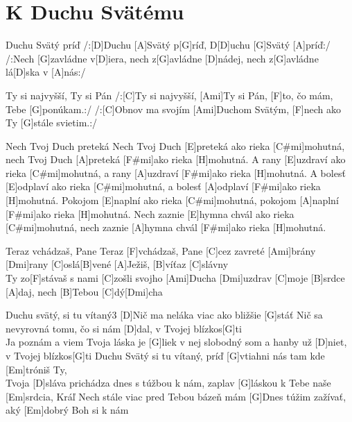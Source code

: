 \documentclass[12pt]{article}
\begin{document}
\newpage
\section{K Duchu Svätému}

\begin{songgroup}{2}
	\begin{groupitem}{Duchu Svätý príď}
		/:[D]Duchu [A]Svätý p[G]ríď,
		D[D]uchu [G]Svätý [A]príď:/
		\\
		/:Nech [G]zavládne v[D]iera,
		nech z[G]avládne [D]nádej,
		nech z[G]avládne lá[D]ska v [A]nás:/
	\end{groupitem}
	\columnbreak
	\begin{groupitem}{Ty si najvyšší, Ty si Pán}
		/:[C]Ty si najvyšší, [Ami]Ty si Pán,
		[F]to, čo mám, Tebe [G]ponúkam.:/
		/:[C]Obnov ma svojím [Ami]Duchom Svätým,
		[F]nech ako Ty [G]stále svietim.:/
	\end{groupitem}
\end{songgroup}

\begin{songgroup}{2}
	\begin{groupitem}{Nech Tvoj Duch preteká}
		Nech Tvoj Duch [E]preteká ako rieka [C#mi]mohutná,
		nech Tvoj Duch [A]preteká [F#mi]ako rieka [H]mohutná.
		A rany [E]uzdraví ako rieka [C#mi]mohutná,
		a rany [A]uzdraví [F#mi]ako rieka [H]mohutná.
		A bolesť [E]odplaví ako rieka [C#mi]mohutná,
		a bolesť [A]odplaví [F#mi]ako rieka [H]mohutná.
		Pokojom [E]naplní ako rieka [C#mi]mohutná,
		pokojom [A]naplní [F#mi]ako rieka [H]mohutná.
		Nech zaznie [E]hymna chvál ako rieka 
		[C#mi]mohutná,
		nech zaznie [A]hymna chvál [F#mi]ako rieka 
		[H]mohutná.
	\end{groupitem}
	\columnbreak
	\begin{groupitem}{Teraz vchádzaš, Pane}
		Teraz [F]vchádzaš, Pane
		[C]cez zavreté [Ami]brány
		[Dmi]rany [C]oslá[B]vené
		[A]Ježiš, [B]víťaz [C]slávny
		\\
		Ty zo[F]stávaš s nami
		[C]zošli svojho [Ami]Ducha
		[Dmi]uzdrav [C]moje [B]srdce
		[A]daj, nech [B]Tebou [C]dý[Dmi]cha
	\end{groupitem}
\end{songgroup}

\begin{song}{Duchu svätý, si tu vítaný}{3}
	[D]Nič ma neláka viac
	ako bližšie [G]stáť
	Nič sa nevyrovná
	tomu, čo si nám [D]dal,
	v Tvojej blízkos[G]ti
	\\
	[D]Ja poznám a viem
	Tvoja láska je [G]liek
	v nej slobodný som
	a hanby už [D]niet,
	v Tvojej blízkos[G]ti
	\columnbreak
	[D]Duchu Svätý si tu vítaný,
	príď [G]vtiahni nás
	tam kde [Em]tróniš Ty,
	\\
	Tvoja [D]sláva prichádza dnes
	s túžbou k nám,
	zaplav [G]láskou k Tebe
	naše [Em]srdcia, Kráľ
	\columnbreak
	[D]Nech stále viac pred Tebou
	bázeň mám
	[G]Dnes túžim zažívať,
	aký [Em]dobrý Boh si k nám
\end{song}
\end{document}
